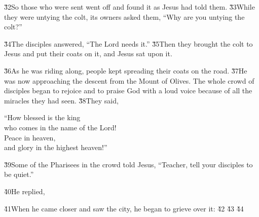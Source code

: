 \v{32}So those who were sent went off and found it as Jesus had told them. \v{33}While they were untying the colt, its owners asked them, ``Why are you untying the colt?''

\v{34}The disciples answered, ``The Lord needs it.'' \v{35}Then they brought the colt to Jesus and put their coats on it, and Jesus sat upon it.

\v{36}As he was riding along, people kept spreading their coats on the road. \v{37}He was now approaching the descent from the Mount of Olives. The whole crowd of disciples began to rejoice and to praise God with a loud voice because of all the miracles they had seen. \v{38}They said,

\begin{poetry}
\poeml ``How blessed is the king \\
\poemll    who comes in the name of the Lord! \\
\poeml Peace in heaven, \\
\poemll    and glory in the highest heaven!''
\end{poetry}

\v{39}Some of the Pharisees in the crowd told Jesus, ``Teacher, tell your disciples to be quiet.''

\v{40}He replied, 

\v{41}When he came closer and saw the city, he began to grieve over it: \v{42} \v{43}  \v{44}

